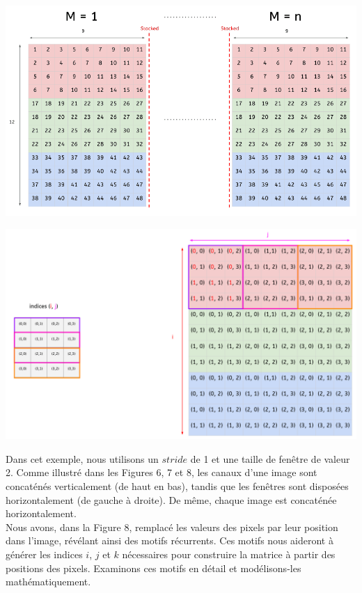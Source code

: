 \begin{multicols}{2}
\includegraphics[width=\columnwidth]{images/im2col-2.png}
\hfill\break

\includegraphics[width=\columnwidth]{images/im2col-3.png}
\hfill\break

Dans cet exemple, nous utilisons un $stride$ de 1 et une taille de fenêtre de valeur 2. 
Comme illustré dans les Figures 6, 7 et 8, les canaux d’une image sont 
concaténés verticalement (de haut en bas), tandis que les fenêtres sont 
disposées horizontalement (de gauche à droite). De même, chaque image est 
concaténée horizontalement. \\

Nous avons, dans la Figure 8, remplacé les valeurs des pixels par leur position dans 
l’image, révélant ainsi des motifs récurrents. Ces motifs nous aideront à 
générer les indices $i$, $j$ et $k$ nécessaires pour construire la matrice à 
partir des positions des pixels. Examinons ces motifs en détail et 
modélisons-les mathématiquement. \\


\end{multicols}
